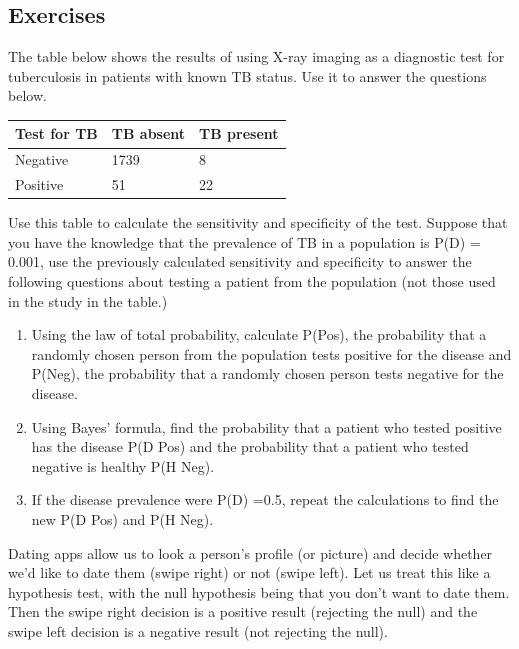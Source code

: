 \documentclass[
  letterpaper,
  DIV=11,
  numbers=noendperiod]{scrreprt}
\begin{document}
\hypertarget{exercises-17}{%
\subsection{Exercises}\label{exercises-17}}

The table below shows the results of using X-ray imaging as a diagnostic
test for tuberculosis in patients with known TB status. Use it to answer
the questions below.

\begin{longtable}[]{@{}lll@{}}
\toprule()
Test for TB & TB absent & TB present \\
\midrule()
\endhead
Negative & 1739 & 8 \\
Positive & 51 & 22 \\
\bottomrule()
\end{longtable}

Use this table to calculate the sensitivity and specificity of the test.
Suppose that you have the knowledge that the prevalence of TB in a
population is P(D) = 0.001, use the previously calculated sensitivity
and specificity to answer the following questions about testing a
patient from the population (not those used in the study in the table.)

\begin{enumerate}
\def\labelenumi{\arabic{enumi}.}
\item
  Using the law of total probability, calculate P(Pos), the probability
  that a randomly chosen person from the population tests positive for
  the disease and P(Neg), the probability that a randomly chosen person
  tests negative for the disease.
\item
  Using Bayes' formula, find the probability that a patient who tested
  positive has the disease P(D \textbar{} Pos) and the probability that
  a patient who tested negative is healthy P(H \textbar{} Neg).
\item
  If the disease prevalence were P(D) =0.5, repeat the calculations to
  find the new P(D \textbar{} Pos) and P(H \textbar{} Neg).
\end{enumerate}

Dating apps allow us to look a person's profile (or picture) and decide
whether we'd like to date them (swipe right) or not (swipe left). Let us
treat this like a hypothesis test, with the null hypothesis being that
you don't want to date them. Then the swipe right decision is a positive
result (rejecting the null) and the swipe left decision is a negative
result (not rejecting the null).
\end{document}
